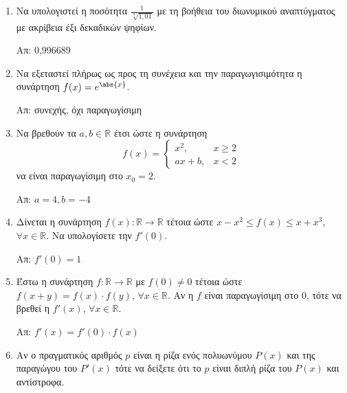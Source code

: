



\pagestyle{askhseis}



\begin{center}
\end{center}

\vspace{\baselineskip}

\begin{enumerate}

  \item Να υπολογιστεί η ποσότητα $ \frac{1}{\sqrt[3]{1,01}} $ με τη βοήθεια
    του διωνυμικού αναπτύγματος με ακρίβεια έξι δεκαδικών ψηφίων.

    \hfill Απ: 0,996689

  \item Να εξεταστεί πλήρως ως προς τη συνέχεια και την παραγωγισιμότητα η
    συνάρτηση $ f(x) = e^{\abs{x}} $.

    \hfill Απ: συνεχής, όχι παραγωγίσιμη 

  \item Να βρεθούν τα $ a, b \in \mathbb{R} $ έτσι ώστε η συνάρτηση 
    \[
      f(x) = \begin{cases}
        x^{2}, & x\geq 2 \\
        ax+b , & x<2
      \end{cases}
    \]
    να είναι παραγωγίσιμη στο $ x_{0} = 2 $.

    \hfill Απ: $ a=4, b=-4 $

  \item Δίνεται η συνάρτηση $ f(x) \colon \mathbb{R} \to \mathbb{R} $ τέτοια
    ώστε $ x - x^{2} \leq f(x) \leq x + x^{3} $, $ \forall x \in \mathbb{R}
    $. Να υπολογίσετε την $ f'(0) $.

    \hfill Απ: $ f'(0) = 1 $

  \item Έστω η συνάρτηση $ f \colon \mathbb{R} \to \mathbb{R} $ με $ f(0)
    \neq 0	$ τέτοια ώστε $ f(x+y) = f(x) \cdot f(y) $, $ \forall x \in
    \mathbb{R} $. Αν η $f$ είναι παραγωγίσιμη στο $0$, τότε να βρεθεί η $
    f'(x) $, $ \forall x \in \mathbb{R} $.

    \hfill Απ: $ f'(x) = f'(0)\cdot f(x) $

  \item Αν ο πραγματικός αριθμός $p$ είναι η ρίζα ενός πολυωνύμου $ P(x)
    $ και της παραγώγου του $ P'(x) $ τότε να δείξετε ότι το $p$ είναι διπλή
    ρίζα του $ P(x) $ και αντίστροφα.


\end{enumerate}
